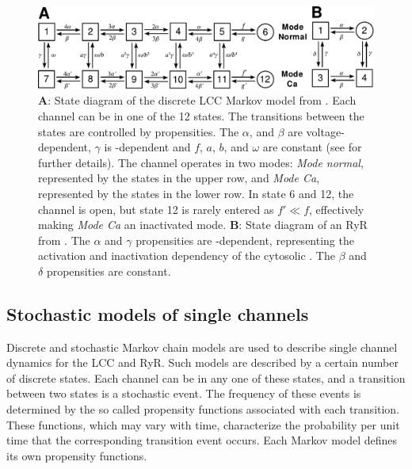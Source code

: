 \begin{figure}[t]
  \label{fig:hake:markov-models}
  \centering
  \includegraphics[height=\largefig]{chapters/hake/pdf/markov_models}
  \caption[Discrete markov models]{\textbf{A}: State diagram of the
    discrete LCC Markov model from \citet{JafriRiceWinslow1998}. Each
    channel can be in one of the 12 states.  The transitions between
    the states are controlled by propensities. The $\alpha$, and
    $\beta$ are voltage-dependent, $\gamma$ is \CaC-dependent and $f$,
    $a$, $b$, and $\omega$ are constant (see
    \citet{JafriRiceWinslow1998} for further details). The channel
    operates in two modes: \textit{Mode normal}, represented by the
    states in the upper row, and \textit{Mode Ca}, represented by the
    states in the lower row. In state 6 and 12, the channel is open,
    but state 12 is rarely entered as $f'\ll{}f$, effectively making
    \textit{Mode Ca} an inactivated mode.  \textbf{B}: State diagram
    of an RyR from \citet{SternSongEtAl1999}. The $\alpha$ and
    $\gamma$ propensities are \Ca-dependent, representing the
    activation and inactivation dependency of the cytosolic \CaC. The
    $\beta$ and $\delta$ propensities are constant.}
\end{figure}

\subsection*{Stochastic models of single channels}
\label{sec:hake:stochastic-models}
    Discrete and stochastic Markov
chain models are used to describe single channel dynamics for the LCC
and RyR. Such models are described by a certain number of discrete
states. Each channel can be in any one of these states, and a
transition between two states is a stochastic event. The frequency of
these events is determined by the so called propensity functions
associated with each transition. These functions, which may vary with
time, characterize the probability per unit time that the
corresponding transition event occurs. Each Markov model defines its
own propensity functions. \par

